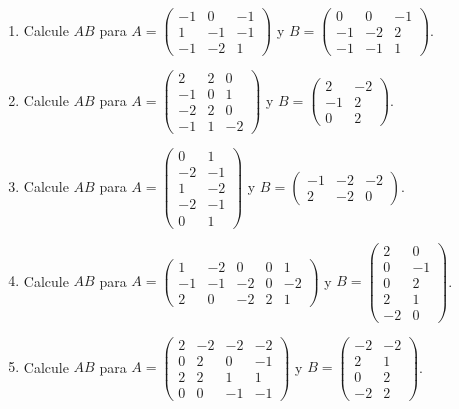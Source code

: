 \documentclass[12pt]{article}
\theoremstyle{remark}
\newcounter{contadorEjercicio}
\newenvironment{listaejercicios}{\begin{enumerate}[label=\textbf{E\arabic*.},leftmargin=2.4em,itemsep=0.52em]\setcounter{enumi}{\value{contadorEjercicio}}}{\setcounter{contadorEjercicio}{\value{enumi}}\end{enumerate}}
\begin{document}
\begin{listaejercicios}
\item Calcule $AB$ para $A=\begin{pmatrix}-1&0&-1\\1&-1&-1\\-1&-2&1\end{pmatrix}$ y $B=\begin{pmatrix}0&0&-1\\-1&-2&2\\-1&-1&1\end{pmatrix}$.

\item Calcule $AB$ para $A=\begin{pmatrix}2&2&0\\-1&0&1\\-2&2&0\\-1&1&-2\end{pmatrix}$ y $B=\begin{pmatrix}2&-2\\-1&2\\0&2\end{pmatrix}$.

\item Calcule $AB$ para $A=\begin{pmatrix}0&1\\-2&-1\\1&-2\\-2&-1\\0&1\end{pmatrix}$ y $B=\begin{pmatrix}-1&-2&-2\\2&-2&0\end{pmatrix}$.

\item Calcule $AB$ para $A=\begin{pmatrix}1&-2&0&0&1\\-1&-1&-2&0&-2\\2&0&-2&2&1\end{pmatrix}$ y $B=\begin{pmatrix}2&0\\0&-1\\0&2\\2&1\\-2&0\end{pmatrix}$.

\item Calcule $AB$ para $A=\begin{pmatrix}2&-2&-2&-2\\0&2&0&-1\\2&2&1&1\\0&0&-1&-1\end{pmatrix}$ y $B=\begin{pmatrix}-2&-2\\2&1\\0&2\\-2&2\end{pmatrix}$.


\end{listaejercicios}
\end{document}
